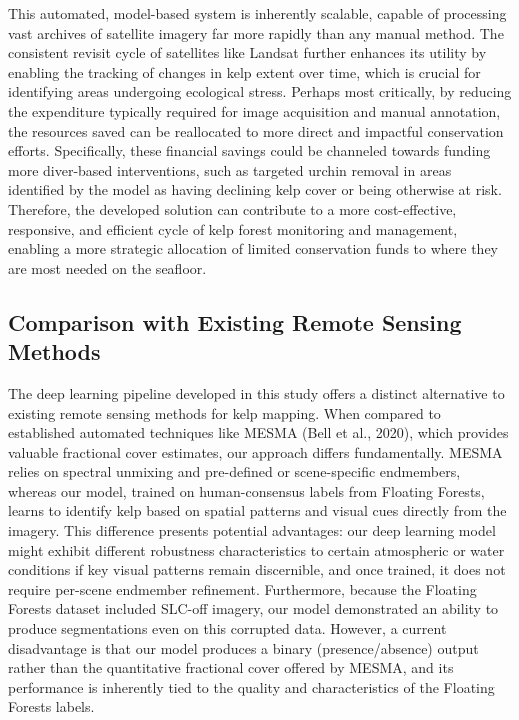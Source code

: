 \documentclass{article}
\begin{document}
This automated, model-based system is inherently scalable, capable of processing vast archives of satellite imagery far more rapidly than any manual method. The consistent revisit cycle of satellites like Landsat further enhances its utility by enabling the tracking of changes in kelp extent over time, which is crucial for identifying areas undergoing ecological stress. Perhaps most critically, by reducing the expenditure typically required for image acquisition and manual annotation, the resources saved can be reallocated to more direct and impactful conservation efforts. Specifically, these financial savings could be channeled towards funding more diver-based interventions, such as targeted urchin removal in areas identified by the model as having declining kelp cover or being otherwise at risk. Therefore, the developed solution can contribute to a more cost-effective, responsive, and efficient cycle of kelp forest monitoring and management, enabling a more strategic allocation of limited conservation funds to where they are most needed on the seafloor.

\subsection{Comparison with Existing Remote Sensing Methods}

The deep learning pipeline developed in this study offers a distinct alternative to existing remote sensing methods for kelp mapping. When compared to established automated techniques like MESMA (Bell et al., 2020), which provides valuable fractional cover estimates, our approach differs fundamentally. MESMA relies on spectral unmixing and pre-defined or scene-specific endmembers, whereas our model, trained on human-consensus labels from Floating Forests, learns to identify kelp based on spatial patterns and visual cues directly from the imagery. This difference presents potential advantages: our deep learning model might exhibit different robustness characteristics to certain atmospheric or water conditions if key visual patterns remain discernible, and once trained, it does not require per-scene endmember refinement. Furthermore, because the Floating Forests dataset included SLC-off imagery, our model demonstrated an ability to produce segmentations even on this corrupted data. However, a current disadvantage is that our model produces a binary (presence/absence) output rather than the quantitative fractional cover offered by MESMA, and its performance is inherently tied to the quality and characteristics of the Floating Forests labels.
\end{document}
